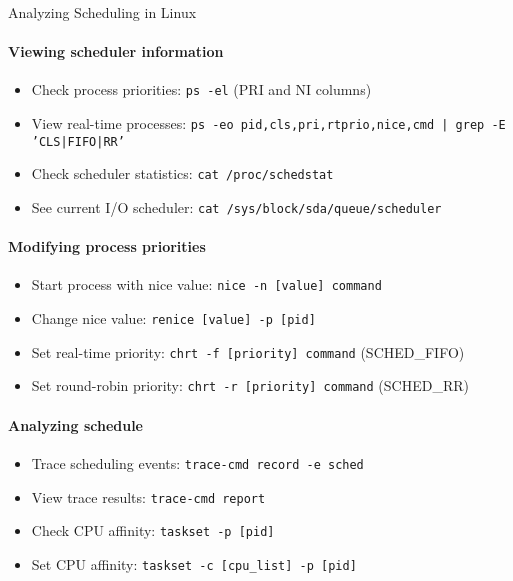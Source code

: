 \begin{KR}{Analyzing Scheduling in Linux}\\
    \paragraph{Viewing scheduler information}
    \begin{itemize}
        \item Check process priorities: \texttt{ps -el} (PRI and NI columns)
        \item View real-time processes: \texttt{ps -eo pid,cls,pri,rtprio,nice,cmd | grep -E 'CLS|FIFO|RR'}
        \item Check scheduler statistics: \texttt{cat /proc/schedstat}
        \item See current I/O scheduler: \texttt{cat /sys/block/sda/queue/scheduler}
    \end{itemize}
    
    \paragraph{Modifying process priorities}
    \begin{itemize}
        \item Start process with nice value: \texttt{nice -n [value] command}
        \item Change nice value: \texttt{renice [value] -p [pid]}
        \item Set real-time priority: \texttt{chrt -f [priority] command} (SCHED\_FIFO)
        \item Set round-robin priority: \texttt{chrt -r [priority] command} (SCHED\_RR)
    \end{itemize}
    
    \paragraph{Analyzing schedule}
    \begin{itemize}
        \item Trace scheduling events: \texttt{trace-cmd record -e sched}
        \item View trace results: \texttt{trace-cmd report}
        \item Check CPU affinity: \texttt{taskset -p [pid]}
        \item Set CPU affinity: \texttt{taskset -c [cpu\_list] -p [pid]}
    \end{itemize}
\end{KR}


